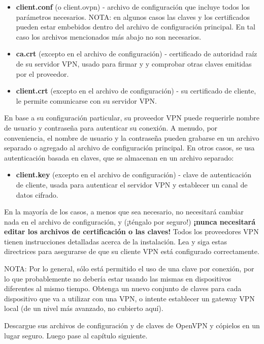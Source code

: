 \documentclass[10pt,a5paper,twoside,,]{book}
\providecommand{\tightlist}{%
  \setlength{\itemsep}{0pt}\setlength{\parskip}{0pt}}
\begin{document}
\begin{itemize}
\tightlist
\item
  \textbf{client.conf} (o client.ovpn) - archivo de configuración que
  incluye todos los parámetros necesarios. NOTA: en algunos casos las
  claves y los certificados pueden estar embebidos dentro del archivo de
  configuración principal. En tal caso los archivos mencionados más
  abajo no son necesarios.
\item
  \textbf{ca.crt} (excepto en el archivo de configuración) - certificado
  de autoridad raíz de su servidor VPN, usado para firmar y y comprobar
  otras claves emitidas por el proveedor.
\item
  \textbf{client.crt} (excepto en el archivo de configuración) - su
  certificado de cliente, le permite comunicarse con su servidor VPN.
\end{itemize}

En base a su configuración particular, su proveedor VPN puede requerirle
nombre de usuario y contraseña para autenticar su conexión. A menudo,
por conveniencia, el nombre de usuario y la contraseña pueden grabarse
en un archivo separado o agregado al archivo de configuración principal.
En otros casos, se usa autenticación basada en claves, que se almacenan
en un archivo separado:

\begin{itemize}
\tightlist
\item
  \textbf{client.key} (excepto en el archivo de configuración) - clave
  de autenticación de cliente, usada para autenticar el servidor VPN y
  establecer un canal de datos cifrado.
\end{itemize}

En la mayoría de los casos, a menos que sea necesario, no necesitará
cambiar nada en el archivo de configuración, y (¡téngalo por seguro!)
\textbf{¡nunca necesitará editar los archivos de certificación o las
claves!} Todos los proveedores VPN tienen instrucciones detalladas
acerca de la instalación. Lea y siga estas directrices para asegurarse
de que su cliente VPN está configurado correctamente.

NOTA: Por lo general, sólo está permitido el uso de una clave por
conexión, por lo que probablemente no debería estar usando las mismas en
dispositivos diferentes al mismo tiempo. Obtenga un nuevo conjunto de
claves para cada dispositivo que va a utilizar con una VPN, o intente
establecer un gateway VPN local (de un nivel más avanzado, no cubierto
aquí).

Descargue sus archivos de configuración y de claves de OpenVPN y
cópielos en un lugar seguro. Luego pase al capítulo siguiente.
\end{document}
